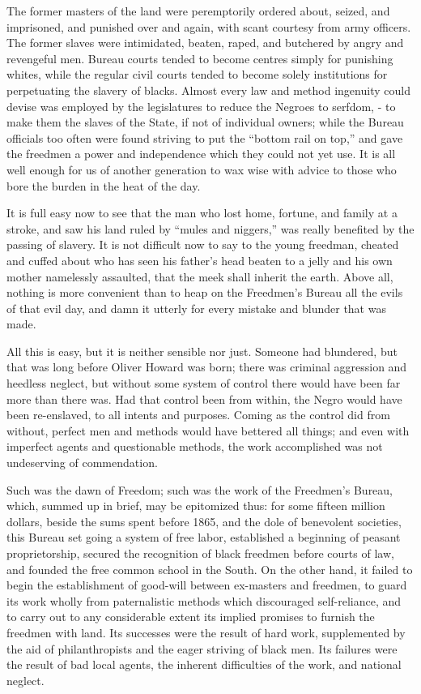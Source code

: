 The former masters of the land were peremptorily ordered about, seized, and imprisoned, and punished over and again, with scant courtesy from army officers. The former slaves were intimidated, beaten, raped, and butchered by angry and revengeful men. Bureau courts tended to become centres simply for punishing whites, while the regular civil courts tended to become solely institutions for perpetuating the slavery of blacks. Almost every law and method ingenuity could devise was employed by the legislatures to reduce the Negroes to serfdom, - to make them the slaves of the State, if not of individual owners; while the Bureau officials too often were found striving to put the “bottom rail on top,” and gave the freedmen a power and independence which they could not yet use. It is all well enough for us of another generation to wax wise with advice to those who bore the burden in the heat of the day.\par

It is full easy now to see that the man who lost home, fortune, and family at a stroke, and saw his land ruled by “mules and niggers,” was really benefited by the passing of slavery. It is not difficult now to say to the young freedman, cheated and cuffed about who has seen his father’s head beaten to a jelly and his own mother namelessly assaulted, that the meek shall inherit the earth. Above all, nothing is more convenient than to heap on the Freedmen’s Bureau all the evils of that evil day, and damn it utterly for every mistake and blunder that was made.\par

All this is easy, but it is neither sensible nor just. Someone had blundered, but that was long before Oliver Howard was born; there was criminal aggression and heedless neglect, but without some system of control there would have been far more than there was. Had that control been from within, the Negro would have been re-enslaved, to all intents and purposes. Coming as the control did from without, perfect men and methods would have bettered all things; and even with imperfect agents and questionable methods, the work accomplished was not undeserving of commendation.\par

Such was the dawn of Freedom; such was the work of the Freedmen’s Bureau, which, summed up in brief, may be epitomized thus: for some fifteen million dollars, beside the sums spent before 1865, and the dole of benevolent societies, this Bureau set going a system of free labor, established a beginning of peasant proprietorship, secured the recognition of black freedmen before courts of law, and founded the free common school in the South. On the other hand, it failed to begin the establishment of good-will between ex-masters and freedmen, to guard its work wholly from paternalistic methods which discouraged self-reliance, and to carry out to any considerable extent its implied promises to furnish the freedmen with land. Its successes were the result of hard work, supplemented by the aid of philanthropists and the eager striving of black men. Its failures were the result of bad local agents, the inherent difficulties of the work, and national neglect.\par

